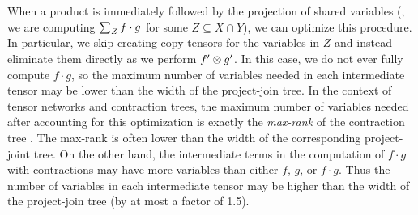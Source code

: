 When a product is immediately followed by the projection of shared variables (\ie, we are computing $\sum_Z f \cdot g$ for some $Z \subseteq X \cap Y$), we can optimize this procedure.
In particular, we skip creating copy tensors for the variables in $Z$ and instead eliminate them directly as we perform $f' \otimes g'$.
In this case, we do not ever fully compute $f \cdot g$, so the maximum number of variables needed in each intermediate tensor may be lower than the width of the project-join tree.
In the context of tensor networks and contraction trees, the maximum number of variables needed after accounting for this optimization is exactly the \emph{max-rank} of the contraction tree \cite{KCMR18}.
The max-rank is often lower than the width of the corresponding project-joint tree.
On the other hand, the intermediate terms in the computation of $f \cdot g$ with contractions may have more variables than either $f$, $g$, or $f \cdot g$.
Thus the number of variables in each intermediate tensor may be higher than the width of the project-join tree (by at most a factor of 1.5).
